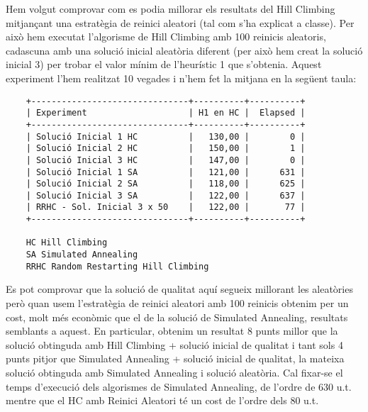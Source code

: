 Hem volgut comprovar com es podia millorar els resultats del Hill Climbing mitjançant una estratègia de reinici aleatori (tal com s'ha explicat a classe). Per això hem executat l'algorisme de Hill Climbing amb 100 reinicis aleatoris, cadascuna amb una solució inicial aleatòria diferent (per això hem creat la solució inicial 3) per trobar el valor mínim de l'heurístic 1 que s'obtenia. Aquest experiment l'hem realitzat 10 vegades i n'hem fet la mitjana en la següent taula:

\begin{verbatim}
	+-------------------------------+----------+----------+
	| Experiment                    | H1 en HC |  Elapsed |
	+-------------------------------+----------+----------+
	| Solució Inicial 1 HC          |   130,00 |        0 |
	| Solució Inicial 2 HC          |   150,00 |        1 |
	| Solució Inicial 3 HC          |   147,00 |        0 |
	| Solució Inicial 1 SA          |   121,00 |      631 |
	| Solució Inicial 2 SA          |   118,00 |      625 |
	| Solució Inicial 3 SA          |   122,00 |      637 |
	| RRHC - Sol. Inicial 3 x 50    |   122,00 |       77 |
	+-------------------------------+----------+----------+

	HC Hill Climbing
	SA Simulated Annealing
	RRHC Random Restarting Hill Climbing
\end{verbatim}

                                          
Es pot comprovar que la solució de qualitat aquí segueix millorant les aleatòries però quan usem l'estratègia de reinici aleatori amb 100 reinicis obtenim per un cost, molt més econòmic que el de la solució de Simulated Annealing, resultats semblants a aquest. En particular, obtenim un resultat 8 punts millor que la solució obtinguda amb Hill Climbing + solució inicial de qualitat i tant sols 4 punts pitjor que Simulated Annealing + solució inicial de qualitat, la  mateixa solució obtinguda amb Simulated Annealing i solució aleatòria. Cal fixar-se el temps d'execució dels algorismes de Simulated Annealing, de l'ordre de 630 u.t. mentre que el HC amb Reinici Aleatori té un cost de l'ordre dels 80 u.t.

